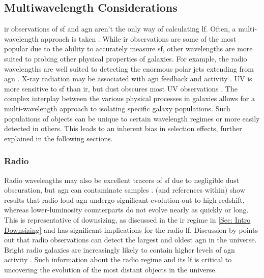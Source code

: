 \subsection{Multiwavelength Considerations}
\gls{ir} observations of \gls{sf} and \gls{agn} aren't the only way of calculating \gls{lf}. Often, a multi-wavelength approach is taken \citep{marshall_decomposing_2007}. While \gls{ir} observations are some of the most popular due to the ability to accurately measure \gls{sf}, other wavelengths are more suited to probing other physical properties of galaxies. For example, the radio wavelengths are well suited to detecting the enormous polar jets extending from \gls{agn} \citep{kaiser_luminosity_2007, mauch_radio_2007}. X-ray radiation may be associated with \gls{agn} feedback and activity \citep{la_franca_tools_2010}. UV is more sensitive to \gls{sf} than \gls{ir}, but dust obscures most UV observations \citep{malefahlo_deep_2022}. The complex interplay between the various physical processes in galaxies allows for a multi-wavelength approach to isolating specific galaxy populations. Such populations of objects can be unique to certain wavelength regimes or more easily detected in others. This leads to an inherent bias in selection effects, further explained in the following sections.

\subsubsection{Radio}
Radio wavelengths may also be excellent tracers of \gls{sf} due to negligible dust obscuration, but \gls{agn} can contaminate samples \citep{yuan_mixture_2017, malefahlo_deep_2022}. \cite{yuan_mixture_2017} (and references within) show results that radio-loud \gls{agn} undergo significant evolution out to high redshift, whereas lower-luminosity counterparts do not evolve nearly as quickly or long. This is representative of downsizing, as discussed in the \gls{ir} regime in \cref{Sec: Intro Downsizing} and has significant implications for the radio \gls{lf}. Discussion by \cite{rigby_luminosity-dependent_2011} points out that radio observations can detect the largest and oldest \gls{agn} in the universe. Bright radio galaxies are increasingly likely to contain higher levels of \gls{agn} activity \citep{sadler_radio_2002}. Such information about the radio regime and its \gls{lf} is critical to uncovering the evolution of the most distant objects in the universe.

